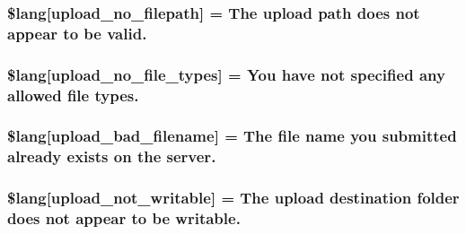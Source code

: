 \subsubsection[{\$lang}]{\setlength{\rightskip}{0pt plus 5cm}\$lang\mbox{[}\textquotesingle{}upload\+\_\+no\+\_\+filepath\textquotesingle{}\mbox{]} = \textquotesingle{}The upload path does not appear to be valid.\textquotesingle{}}\label{_admin_2system_2language_2english_2upload__lang_8php_a3c17908c53072c6a5ef593760aaaa704}
\hypertarget{_admin_2system_2language_2english_2upload__lang_8php_ab188c98e583c81905dedaad54ad452bb}{}
\subsubsection[{\$lang}]{\setlength{\rightskip}{0pt plus 5cm}\$lang\mbox{[}\textquotesingle{}upload\+\_\+no\+\_\+file\+\_\+types\textquotesingle{}\mbox{]} = \textquotesingle{}You have not specified any allowed file types.\textquotesingle{}}\label{_admin_2system_2language_2english_2upload__lang_8php_ab188c98e583c81905dedaad54ad452bb}
\hypertarget{_admin_2system_2language_2english_2upload__lang_8php_abb379322384f3f35952a539c63e2c8f7}{}
\subsubsection[{\$lang}]{\setlength{\rightskip}{0pt plus 5cm}\$lang\mbox{[}\textquotesingle{}upload\+\_\+bad\+\_\+filename\textquotesingle{}\mbox{]} = \textquotesingle{}The file name you submitted already exists {\bf on} the server.\textquotesingle{}}\label{_admin_2system_2language_2english_2upload__lang_8php_abb379322384f3f35952a539c63e2c8f7}
\hypertarget{_admin_2system_2language_2english_2upload__lang_8php_aed6bfb5a9094179427f61fcbb582145b}{}
\subsubsection[{\$lang}]{\setlength{\rightskip}{0pt plus 5cm}\$lang\mbox{[}\textquotesingle{}upload\+\_\+not\+\_\+writable\textquotesingle{}\mbox{]} = \textquotesingle{}The upload destination folder does not appear to be writable.\textquotesingle{}}\label{_admin_2system_2language_2english_2upload__lang_8php_aed6bfb5a9094179427f61fcbb582145b}
